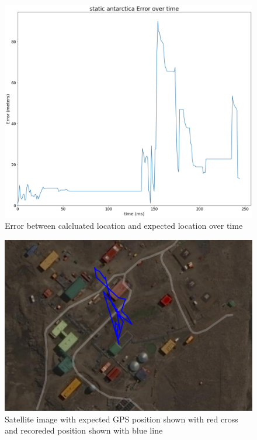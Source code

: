\begin{figure}[h]
    \begin{centering}
        \includegraphics[width=14cm,keepaspectratio]{Figures/2021_3_30_static_antarctica error over time.png}
        \caption{Error between calcluated location and expected location over time}
        \label{fig:antarcticaStaticError}
    \end{centering}
\end{figure}

\begin{figure}[h]
    \begin{centering}
        \includegraphics[width=14cm,keepaspectratio]{Figures/2021_3_30_static_antarctica_Satellite.PNG}
        \caption{Satellite image with expected GPS position shown with red cross and recoreded position shown with blue line}
        \label{fig:antarcticaSatelliteImage}
    \end{centering}
\end{figure}

